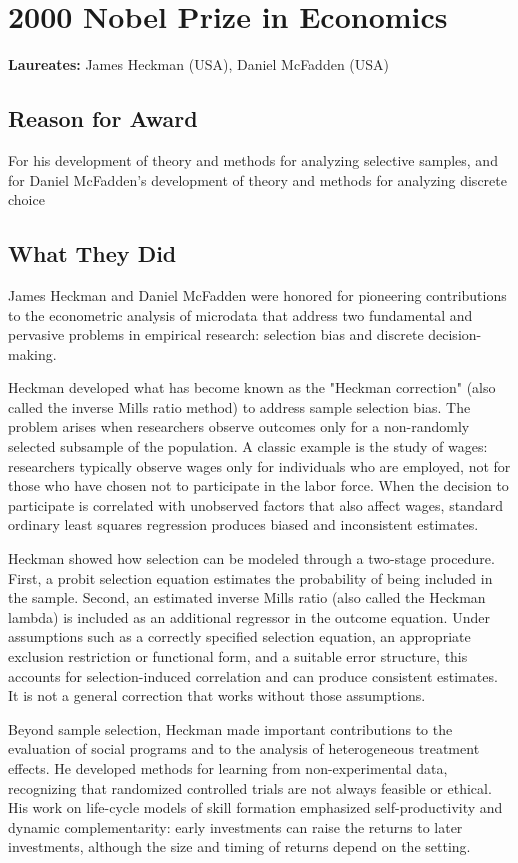 \chapter{2000 Nobel Prize in Economics}
\textbf{Laureates: }James Heckman (USA), Daniel McFadden (USA)

\section*{Reason for Award}
For his development of theory and methods for analyzing selective samples, and
for Daniel McFadden's development of theory and methods for analyzing discrete
choice

\section{What They Did}
James Heckman and Daniel McFadden were honored for pioneering contributions to
the econometric analysis of microdata that address two fundamental and pervasive
problems in empirical research: selection bias and discrete decision-making.

Heckman developed what has become known as the "Heckman correction" (also
called the inverse Mills ratio method) to address sample selection bias. The
problem arises when researchers observe outcomes only for a non-randomly
selected subsample of the population. A classic example is the study of wages:
researchers typically observe wages only for individuals who are employed, not
for those who have chosen not to participate in the labor force. When the
decision to participate is correlated with unobserved factors that also affect
wages, standard ordinary least squares regression produces biased and
inconsistent estimates.

Heckman showed how selection can be modeled through a two-stage procedure. First,
a probit selection equation estimates the probability of being included in the
sample. Second, an estimated inverse Mills ratio (also called the Heckman lambda)
is included as an additional regressor in the outcome equation. Under assumptions
such as a correctly specified selection equation, an appropriate exclusion
restriction or functional form, and a suitable error structure, this accounts for
selection-induced correlation and can produce consistent estimates. It is not a
general correction that works without those assumptions.

Beyond sample selection, Heckman made important contributions to the evaluation
of social programs and to the analysis of heterogeneous treatment effects. He
developed methods for learning from non-experimental data, recognizing that
randomized controlled trials are not always feasible or ethical. His work on
life-cycle models of skill formation emphasized self-productivity and dynamic
complementarity: early investments can raise the returns to later investments,
although the size and timing of returns depend on the setting.

